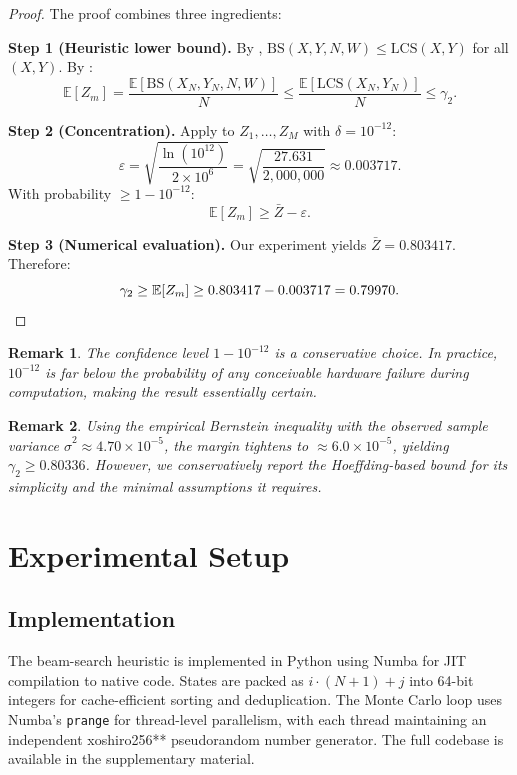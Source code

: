 \documentclass[11pt,a4paper]{article}
\newtheorem{remark}{Remark}
\theoremstyle{definition}
\newcommand{\E}{\mathbb{E}}
\newcommand{\LCS}{\mathrm{LCS}}
\newcommand{\BS}{\mathrm{BS}}
\begin{document}
\begin{proof}
  The proof combines three ingredients:

  \medskip\noindent\textbf{Step 1 (Heuristic lower bound).}
  By , $\BS(X, Y, N, W) \leq \LCS(X, Y)$ for all
  $(X, Y)$. By :
  \[
    \E[Z_m] = \frac{\E[\BS(X_N, Y_N, N, W)]}{N}
    \leq \frac{\E[\LCS(X_N, Y_N)]}{N} \leq \gamma_2.
  \]

  \medskip\noindent\textbf{Step 2 (Concentration).}
  Apply  to $Z_1, \ldots, Z_M$ with $\delta = 10^{-12}$:
  \[
    \varepsilon = \sqrt{\frac{\ln(10^{12})}{2 \times 10^6}}
    = \sqrt{\frac{27.631}{2{,}000{,}000}}
    \approx 0.003717.
  \]
  With probability $\geq 1 - 10^{-12}$:
  \[
    \E[Z_m] \geq \bar{Z} - \varepsilon.
  \]

  \medskip\noindent\textbf{Step 3 (Numerical evaluation).}
  Our experiment yields $\bar{Z} = 0.803417$. Therefore:
  \[
    \gamma_2 \geq \E[Z_m] \geq 0.803417 - 0.003717 = 0.79970.
    \qedhere
  \]
\end{proof}

\begin{remark}
  The confidence level $1 - 10^{-12}$ is a conservative choice. In practice,
  $10^{-12}$ is far below the probability of any conceivable hardware failure
  during computation, making the result essentially certain.
\end{remark}

\begin{remark}
  Using the empirical Bernstein inequality with the observed sample variance
  $\hat{\sigma}^2 \approx 4.70 \times 10^{-5}$, the margin tightens to
  $\approx 6.0 \times 10^{-5}$, yielding $\gamma_2 \geq 0.80336$. However, we
  conservatively report the Hoeffding-based bound for its simplicity and the
  minimal assumptions it requires.
\end{remark}

\section{Experimental Setup}
\label{sec:setup}

\subsection{Implementation}

The beam-search heuristic is implemented in Python using Numba for JIT
compilation to native code. States are packed as $i \cdot (N+1) + j$ into
64-bit integers for cache-efficient sorting and deduplication.  The Monte
Carlo loop uses Numba's \texttt{prange} for thread-level parallelism, with
each thread maintaining an independent xoshiro256** pseudorandom number
generator. The full codebase is available in the supplementary material.
\end{document}
